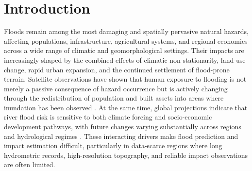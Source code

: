 \documentclass[pdflatex,sn-mathphys-ay]{sn-jnl}
\theoremstyle{thmstyleone}
\begin{document}


\maketitle

\doublespacing
\modulolinenumbers[1]
\linenumbers

\section{Introduction}
\label{sec:intro}

Floods remain among the most damaging and spatially pervasive natural
hazards, affecting populations, infrastructure, agricultural systems,
and regional economies across a wide range of climatic and
geomorphological settings.  Their impacts are increasingly shaped by
the combined effects of climatic non-stationarity, land-use change,
rapid urban expansion, and the continued settlement of flood-prone
terrain.  Satellite observations have shown that human exposure to
flooding is not merely a passive consequence of hazard occurrence but
is actively changing through the redistribution of population and built
assets into areas where inundation has been observed
\citep{Jongman2012,Ceola2014,Tellman2021,Rentschler2022}.  At the same time, global projections indicate
that river flood risk is sensitive to both climate forcing and
socio-economic development pathways, with future changes varying
substantially across regions and hydrological regimes
\citep{Hirabayashi2013,Winsemius2016,Alfieri2016}.  These interacting
drivers make flood prediction and impact estimation difficult,
particularly in data-scarce regions where long hydrometric records,
high-resolution topography, and reliable impact observations are often
limited.
\end{document}
